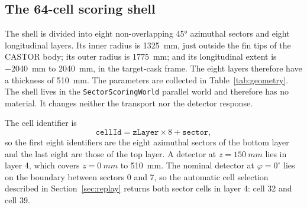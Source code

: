 \documentclass[11pt,a4paper]{article}
\begin{document}
\subsection{The 64-cell scoring shell}

The shell is divided into eight non-overlapping \ang{45} azimuthal sectors and
eight longitudinal layers. Its inner radius is \SI{1325}{mm}, just outside the
fin tips of the CASTOR body; its outer radius is \SI{1775}{mm}; and its
longitudinal extent is \SI{-2040}{mm} to \SI{+2040}{mm}, in the target-cask
frame. The eight layers therefore have a thickness of \SI{510}{mm}. The
parameters are collected in Table~\ref{tab:geometry}. The shell lives in the
\texttt{SectorScoringWorld} parallel world and therefore has no material. It
changes neither the transport nor the detector response.

The cell identifier is
\begin{equation}
  \texttt{cellId} = \texttt{zLayer}\times 8 + \texttt{sector},
  \label{eq:cellid}
\end{equation}
so the first eight identifiers are the eight azimuthal sectors of the bottom
layer and the last eight are those of the top layer. A detector at
$z=\SI{150}{mm}$ lies in layer 4, which covers $z=\SI{0}{mm}$ to
\SI{510}{mm}. The nominal detector at $\varphi=0^\circ$ lies on the boundary
between sectors 0 and 7, so the automatic cell selection described in
Section~\ref{sec:replay} returns both sector cells in layer 4: cell 32 and cell
39.
\end{document}
